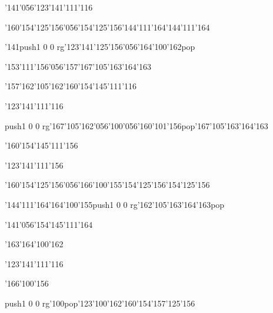 \null\vfill\ipa\centerline{\enskip\enskip\enskip\enskip\enskip\enskip\enskip\char'141\char'056\char'123\char'141\char'111\char'116}\medskip\centerline{\enskip\char'160\char'154\char'125\char'156\char'056\char'154\char'125\char'156\enskip\enskip\enskip\char'144\char'111\char'164\enskip\enskip\enskip\char'144\char'111\char'164}\medskip\centerline{\enskip\char'141\enskip\enskip\enskip\enskip\enskip\enskip\enskip\enskip\pdfcolorstack\match push{1 0 0 rg}\char'123\char'141\char'125\char'156\char'056\char'164\char'100\char'162\pdfcolorstack\match pop{}}\medskip\centerline{\enskip\char'153\char'111\char'156\char'056\char'157\enskip\enskip\enskip\enskip\enskip\char'167\char'105\char'163\char'164\char'163}\medskip\centerline{\enskip\char'157\enskip\char'162\char'105\char'162\enskip\enskip\enskip\enskip\char'160\char'154\char'145\char'111\char'116}\medskip\vfill\footline{\hfil\tt\folio\hfil}\eject
\null\vfill\ipa\centerline{\enskip\enskip\enskip\enskip\enskip\enskip\enskip\enskip\enskip\enskip\enskip\enskip}\medskip\centerline{\enskip\enskip\enskip\enskip\enskip\enskip\enskip\enskip\enskip\enskip\enskip\enskip\enskip\enskip\enskip\enskip\enskip\enskip\enskip}\medskip\centerline{\enskip\enskip\enskip\enskip\enskip\enskip\enskip\enskip\enskip\enskip\char'123\char'141\char'111\char'116\enskip\enskip\enskip\enskip}\medskip\centerline{\enskip\pdfcolorstack\match push{1 0 0 rg}\char'167\char'105\char'162\char'056\char'100\char'056\char'160\char'101\char'156\pdfcolorstack\match pop{}\enskip\char'167\char'105\char'163\char'164\char'163}\medskip\centerline{\enskip\enskip\enskip\enskip\enskip\enskip\enskip\enskip\enskip\char'160\char'154\char'145\char'111\char'156}\medskip\vfill\footline{\hfil\tt\folio\hfil}\eject
\null\vfill\ipa\centerline{\enskip\enskip\enskip\enskip\enskip\enskip\enskip\enskip\char'123\char'141\char'111\char'156}\medskip\centerline{\enskip\char'160\char'154\char'125\char'156\char'056\char'166\char'100\char'155\enskip\enskip\enskip\char'154\char'125\char'156\enskip\enskip\enskip\char'154\char'125\char'156}\medskip\centerline{\enskip\enskip\enskip\enskip\enskip\enskip\enskip\enskip\enskip\enskip\enskip\enskip\enskip\enskip\enskip\enskip\enskip}\medskip\centerline{\enskip\char'144\char'111\char'164\enskip\enskip\char'164\char'100\char'155\enskip\pdfcolorstack\match push{1 0 0 rg}\char'162\char'105\char'163\char'164\char'163\pdfcolorstack\match pop{}}\medskip\centerline{\enskip\enskip\enskip\enskip\enskip\enskip\enskip\enskip\enskip\enskip\enskip\enskip\enskip\enskip}\medskip\vfill\footline{\hfil\tt\folio\hfil}\eject
\null\vfill\ipa\centerline{\enskip\enskip\enskip\enskip\enskip\enskip\enskip\char'141\char'056\char'154\char'145\char'111\char'164}\medskip\centerline{\enskip\char'163\char'164\char'100\char'162\enskip\enskip\enskip\enskip\enskip\enskip\enskip\enskip\enskip\enskip\enskip\enskip\enskip\enskip\enskip}\medskip\centerline{\enskip\enskip\enskip\enskip\enskip\enskip\enskip\enskip\enskip\enskip\char'123\char'141\char'111\char'116\enskip\enskip\enskip\enskip}\medskip\centerline{\enskip\enskip\enskip\enskip\enskip\char'166\char'100\char'156\enskip\enskip\enskip\enskip\enskip\enskip}\medskip\centerline{\enskip\pdfcolorstack\match push{1 0 0 rg}\char'100\pdfcolorstack\match pop{}\enskip\char'123\char'100\char'162\enskip\enskip\enskip\enskip\char'160\char'154\char'157\char'125\char'156}\medskip\vfill\footline{\hfil\tt\folio\hfil}\eject
